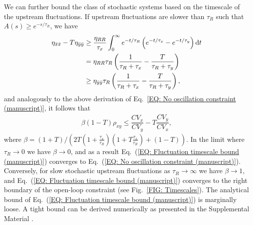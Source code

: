 \documentclass[%
 reprint,prx,
superscriptaddress,
%
%
%
%
%
%
%
%
%
 amsmath,amssymb,
 aps,
%
%
%
%
%
%
]{revtex4-2}
\begin{document}
{We can further bound the class of stochastic systems based on the timescale of the upstream fluctuations. If  upstream fluctuations are slower than $\tau_R$ such that 
%
%
$A(s) \geq e^{-s/\tau_R}$, 
we have 
\begin{align*}
 \eta_{\bar{x}\bar{x}} - T \eta_{\bar{y}\bar{y}} 
 &\geq 
 \frac{\eta_{RR}}{\tau_{x}}\int_{0}^{\infty} e^{-t/\tau_{R}} \left( e^{-t/\tau_{x}} - e^{-t/\tau_{y}}\right)  \mathrm{d} t \\
 &= \eta_{RR}\tau_{R}\left(\frac{1}{\tau_{R} + \tau_{x}} - \frac{T}{\tau_{R} + \tau_{y}}\right) \\
 &\geq \eta_{\bar{y}\bar{y}}\tau_{R}\left(\frac{1}{\tau_{R} + \tau_{x}} - \frac{T}{\tau_{R} + \tau_{y}}\right),
\end{align*}
and analogously to the above derivation of Eq.~\eqref{EQ: No oscillation constraint (manuscript)}, it follows that
%
%
\begin{align}
%
\beta(1-T) \rho_{xy} \leqslant  \dfrac{CV_{x}}{CV_{y}} - T\dfrac{CV_{y}}{CV_{x}} ,
 \label{EQ: Fluctuation timescale bound (manuscript)} 
\end{align}
where $\beta= (1+T)/\left(2T(1+\frac{\tau_{x}}{\tau_{R}})(1+T\frac{\tau_{x}}{\tau_{R}})+(1-T)\right)$. In the limit where $\tau_{R} \to 0$ we have $\beta \to 0$, and as a result Eq.~(\ref{EQ: Fluctuation timescale bound (manuscript)}) converges to Eq.~(\ref{EQ: No oscillation constraint (manuscript)}). Conversely, for slow stochastic upstream fluctuations as $\tau_{R} \to \infty$ we have $\beta \to 1$, and Eq.~(\ref{EQ: Fluctuation timescale bound (manuscript)}) converges to the right boundary of the open-loop constraint (see Fig.~\ref{FIG: Timescales}). 
The analytical bound of Eq.~(\ref{EQ: Fluctuation timescale bound (manuscript)}) is marginally loose. A tight bound can be derived numerically as presented in the Supplemental Material \cite{SI}.}\\
\end{document}
